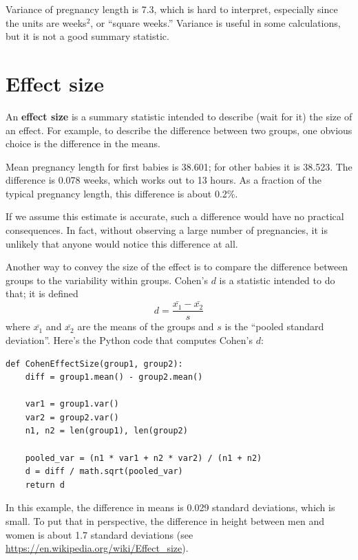 \documentclass[12pt]{book}
\theoremstyle{exercise}
\begin{document}
Variance of pregnancy length is 7.3, which is hard to interpret,
especially since the units are weeks$^2$, or ``square weeks.''
Variance is useful in some calculations, but it is not
a good summary statistic.


\section{Effect size}%

An {\bf effect size} is a summary statistic intended to describe (wait
for it) the size of an effect.  For example, to describe the
difference between two groups, one obvious choice is the difference in
the means.%

Mean pregnancy length for first babies is 38.601; for
other babies it is 38.523.  The difference is 0.078 weeks, which works
out to 13 hours.  As a fraction of the typical pregnancy length, this
difference is about 0.2\%.%

If we assume this estimate is accurate, such a difference
would have no practical consequences.  In fact, without
observing a large number of pregnancies, it is unlikely that anyone
would notice this difference at all.%

Another way to convey the size of the effect is to compare the
difference between groups to the variability within groups.
Cohen's $d$ is a statistic intended to do that; it is defined
%
\[ d = \frac{\bar{x_1} - \bar{x_2}}{s}  \]
%
where $\bar{x_1}$ and $\bar{x_2}$ are the means of the groups and
$s$ is the ``pooled standard deviation''.  Here's the Python
code that computes Cohen's $d$:%

\begin{verbatim}
def CohenEffectSize(group1, group2):
    diff = group1.mean() - group2.mean()

    var1 = group1.var()
    var2 = group2.var()
    n1, n2 = len(group1), len(group2)

    pooled_var = (n1 * var1 + n2 * var2) / (n1 + n2)
    d = diff / math.sqrt(pooled_var)
    return d
\end{verbatim}

In this example, the difference in means is 0.029 standard deviations,
which is small.  To put that in perspective, the difference in
height between men and women is about 1.7 standard deviations (see
\url{https://en.wikipedia.org/wiki/Effect_size}).
\end{document}
